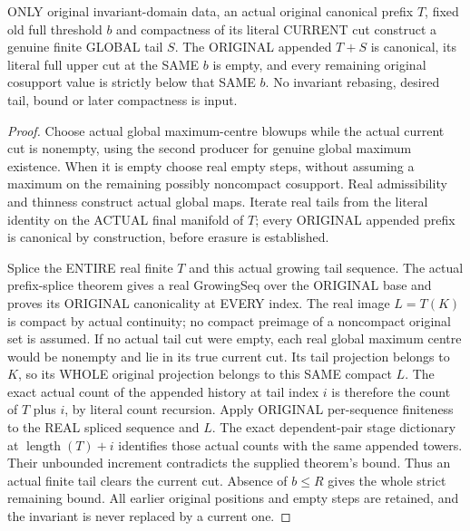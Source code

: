 \begin{theorem}
\label{hir:original-current-compact-cut-actual-global-tail-phase}
\leanok
ONLY original invariant-domain data, an actual original canonical prefix
$T$, fixed old full threshold $b$ and compactness of its literal CURRENT cut
construct a genuine finite GLOBAL tail $S$. The ORIGINAL appended $T+S$
is canonical, its literal full upper cut at the SAME $b$ is empty, and every
remaining original cosupport value is strictly below that SAME $b$.
No invariant rebasing, desired tail, bound or later compactness is input.
\end{theorem}
\begin{proof}
Choose actual global maximum-centre blowups while the actual current cut is
nonempty, using the second producer for genuine global maximum existence.
When it is empty choose real empty steps, without assuming a maximum on
the remaining possibly noncompact cosupport. Real admissibility and thinness
construct actual global maps. Iterate real tails from the literal identity
on the ACTUAL final manifold of $T$; every ORIGINAL appended prefix is
canonical by construction, before erasure is established.

Splice the ENTIRE real finite $T$ and this actual growing tail sequence.
The actual prefix-splice theorem gives a real GrowingSeq over the ORIGINAL
base and proves its ORIGINAL canonicality at EVERY index. The real image
$L=T(K)$ is compact by actual continuity; no compact preimage of a noncompact
original set is assumed. If no actual tail cut were empty, each real global
maximum centre would be nonempty and lie in its true current cut. Its tail
projection belongs to $K$, so its WHOLE original projection belongs to this
SAME compact $L$. The exact actual count of the appended history at tail
index $i$ is therefore the count of $T$ plus $i$, by literal count recursion.
Apply ORIGINAL per-sequence finiteness to the REAL spliced sequence and $L$.
The exact dependent-pair stage dictionary at $\operatorname{length}(T)+i$
identifies those actual counts with the same appended towers. Their
unbounded increment contradicts the supplied theorem's bound. Thus an
actual finite tail clears the current cut. Absence of $b\le R$ gives the
whole strict remaining bound. All earlier original positions and empty
steps are retained, and the invariant is never replaced by a current one.
\end{proof}

